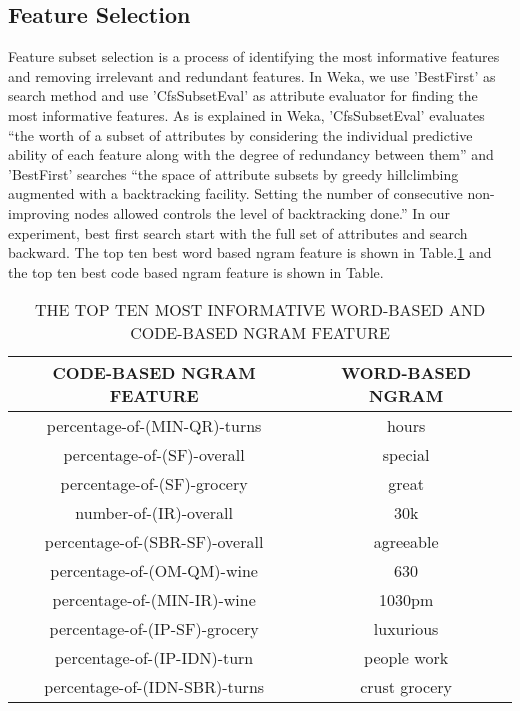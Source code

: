 \documentclass[11pt]{article} %
\begin{document}
\subsection{Feature Selection}
Feature subset selection is a process of identifying the most informative features and removing irrelevant and redundant features. In Weka, we use 'BestFirst' as search method and use 'CfsSubsetEval' as attribute evaluator for finding the most informative features. As is explained in Weka, 'CfsSubsetEval' evaluates ``the worth of a subset of attributes by considering the individual predictive ability of each feature along with the degree of redundancy between them'' and 'BestFirst' searches ``the space of attribute subsets by greedy hillclimbing augmented with a backtracking facility. Setting the number of consecutive non-improving nodes allowed controls the level of backtracking done.'' In our experiment, best first search start with the full set of attributes and search backward. The top ten best word based ngram feature is shown in Table.\ref{tab:selected_ngram} and the top ten best code based ngram feature is shown in Table.
\begin{table}
  \centering
  \caption{THE TOP TEN MOST INFORMATIVE WORD-BASED AND CODE-BASED NGRAM FEATURE}
  \begin{tabular}{|c|c|}
     \hline
CODE-BASED NGRAM FEATURE & WORD-BASED NGRAM \\
  \hline
percentage-of-(MIN-QR)-turns & hours \\

percentage-of-(SF)-overall & special\\

percentage-of-(SF)-grocery & great\\

number-of-(IR)-overall & 30k\\

percentage-of-(SBR-SF)-overall & agreeable\\

percentage-of-(OM-QM)-wine & 630\\

percentage-of-(MIN-IR)-wine & 1030pm\\

percentage-of-(IP-SF)-grocery & luxurious\\

percentage-of-(IP-IDN)-turn & people work\\

percentage-of-(IDN-SBR)-turns & crust grocery\\
  \hline
  \end{tabular}\label{tab:selected_ngram}
\end{table}
 
\end{document}
